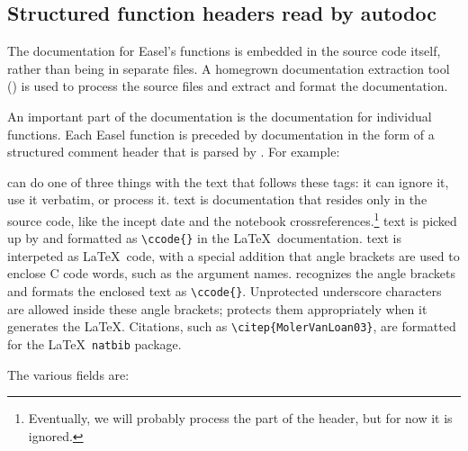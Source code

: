 \subsection{Structured function headers read by autodoc}
The documentation for Easel's functions is embedded in the source code
itself, rather than being in separate files. A homegrown documentation
extraction tool () is used to process the source files
and extract and format the documentation.

An important part of the documentation is the documentation for
individual functions.  Each Easel function is preceded by
documentation in the form of a structured comment header that is
parsed by . For example:



 can do one of three things with the text that follows
these tags: it can ignore it, use it verbatim, or process
it.  text is documentation that resides only in the
source code, like the incept date and the notebook
crossreferences.\footnote{Eventually, we will probably process the
 part of the header, but for now it is ignored.}
 text is picked up by  and formatted as
\verb+\ccode{}+ in the \LaTeX\ documentation.  text
is interpeted as \LaTeX\ code, with a special addition that angle
brackets are used to enclose C code words, such as the argument names.
 recognizes the angle brackets and formats the enclosed
text as \verb+\ccode{}+.  Unprotected underscore characters are
allowed inside these angle brackets;  protects them
appropriately when it generates the \LaTeX. Citations, such as
\verb+\citep{MolerVanLoan03}+, are formatted for the \LaTeX\
\verb+natbib+ package.

The various fields are:

